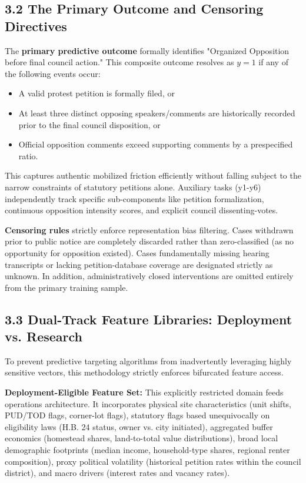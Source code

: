 \subsection*{3.2 The Primary Outcome and Censoring Directives}
The \textbf{primary predictive outcome} formally identifies "Organized Opposition before final council action." This composite outcome resolves as $y=1$ if any of the following events occur:
\begin{itemize}
    \item A valid protest petition is formally filed, or
    \item At least three distinct opposing speakers/comments are historically recorded prior to the final council disposition, or
    \item Official opposition comments exceed supporting comments by a prespecified ratio.
\end{itemize}
This captures authentic mobilized friction efficiently without falling subject to the narrow constraints of statutory petitions alone. Auxiliary tasks (y1-y6) independently track specific sub-components like petition formalization, continuous opposition intensity scores, and explicit council dissenting-votes. 

\textbf{Censoring rules} strictly enforce representation bias filtering. Cases withdrawn prior to public notice are completely discarded rather than zero-classified (as no opportunity for opposition existed). Cases fundamentally missing hearing transcripts or lacking petition-database coverage are designated strictly as unknown. In addition, administratively closed interventions are omitted entirely from the primary training sample.

\subsection*{3.3 Dual-Track Feature Libraries: Deployment vs. Research}
To prevent predictive targeting algorithms from inadvertently leveraging highly sensitive vectors, this methodology strictly enforces bifurcated feature access.

\textbf{Deployment-Eligible Feature Set:} This explicitly restricted domain feeds operations architecture. It incorporates physical site characteristics (unit shifts, PUD/TOD flags, corner-lot flags), statutory flags based unequivocally on eligibility laws (H.B. 24 status, owner vs. city initiated), aggregated buffer economics (homestead shares, land-to-total value distributions), broad local demographic footprints (median income, household-type shares, regional renter composition), proxy political volatility (historical petition rates within the council district), and macro drivers (interest rates and vacancy rates).

